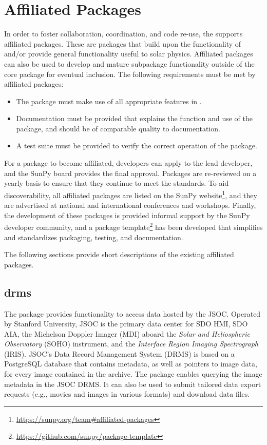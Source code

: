 \section{Affiliated Packages}
\label{sec:affil_package}

In order to foster collaboration, coordination, and code re-use, the \sunpyproj supports affiliated packages.
These are \python packages that build upon the functionality of \sunpypkg and/or provide general functionality useful to solar physics.
Affiliated packages can also be used to develop and mature subpackage functionality outside of the \sunpypkg core package for eventual inclusion.
The following requirements must be met by affiliated packages:
\begin{itemize}
    \item The package must make use of all appropriate features in \sunpypkg.
    \item Documentation must be provided that explains the function and use of the package, and should be of comparable quality to \sunpypkg documentation.
    \item A test suite must be provided to verify the correct operation of the package.
\end{itemize}
For a package to become affiliated, developers can apply to the lead developer, and the SunPy board provides the final approval.
Packages are re-reviewed on a yearly basis to ensure that they continue to meet the standards.
To aid discoverability, all affiliated packages are listed on the SunPy website\footnote{\url{https://sunpy.org/team\#affiliated-packages}}, and they are advertised at national and international conferences and workshops.
Finally, the development of these packages is provided informal support by the SunPy developer community, and
a package template\footnote{\url{https://github.com/sunpy/package-template}} has been developed that simplifies and standardizes packaging, testing, and documentation.

The following sections provide short descriptions of the existing affiliated packages.

\subsection{drms}
\label{sec:drms}

The  \citep{Glogowski2019drms} package provides functionality to access data hosted by the JSOC.
Operated by Stanford University, JSOC is the primary data center for SDO HMI, SDO AIA, the Michelson Doppler Imager (MDI) aboard the \textit{Solar and Heliospheric Observatory} (SOHO) instrument, and the \textit{Interface Region Imaging Spectrograph} (IRIS).
JSOC's Data Record Management System (DRMS) is based on a PostgreSQL database that contains metadata, as well as pointers to image data, for every image contained in the archive.
The  package enables querying the image metadata in the JSOC DRMS.
It can also be used to submit tailored data export requests (e.g., movies and images in various formats) and download data files.


